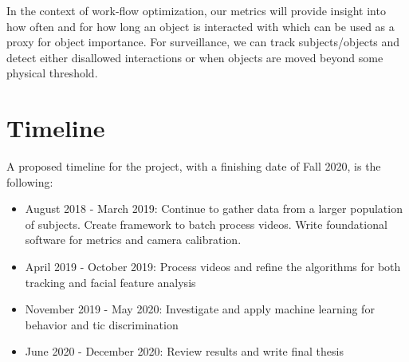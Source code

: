 \documentclass[11pt]{article}
\begin{document}
In the context of work-flow optimization, our metrics will provide insight into how often and for how long an object is interacted with which can be used as a proxy for object importance. For surveillance, we can track subjects/objects and detect either disallowed interactions or when objects are moved beyond some physical threshold.
\section{Timeline}
A proposed timeline for the project, with a finishing date of Fall 2020, is the following:
\begin{itemize}
  \item August 2018 - March 2019: Continue to gather data from a larger population of subjects. Create framework to batch process videos. Write foundational software for metrics and camera calibration.
  \item April 2019 - October 2019: Process videos and refine the algorithms for both tracking and facial feature analysis
  \item November 2019 - May 2020: Investigate and apply machine learning for behavior and tic discrimination
  \item June 2020 - December  2020: Review results and write final thesis
\end{itemize}

\pagebreak
%

\end{document}
